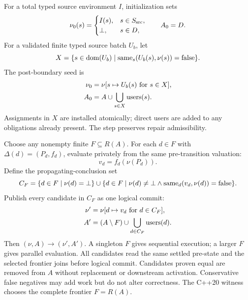 For a total typed source environment $I$, initialization sets
\begin{equation}
\nu_0(s)=\begin{cases}I(s),&s\in S_{\mathrm{src}},\\\bot,&s\in D,\end{cases}\qquad A_0=D.
\label{eq:init}
\end{equation}
For a validated finite typed source batch $U_b$, let
\begin{equation}
X=\{s\in\operatorname{dom}(U_b)\mid \operatorname{same}_s(U_b(s),\nu(s))=\mathrm{false}\}.
\label{eq:changed}
\end{equation}
The post-boundary seed is
\begin{align}
\nu_0&=\nu[s\mapsto U_b(s)\text{ for }s\in X],\label{eq:updateval}\\
A_0&=A\cup\bigcup_{s\in X}\operatorname{users}(s).\label{eq:updateactive}
\end{align}
Assignments in $X$ are installed atomically; direct users are added to any obligations already present. The step preserves repair admissibility.

Choose any nonempty finite $F\subseteq R(A)$. For each $d\in F$ with $\Delta(d)=(P_d,f_d)$, evaluate privately from the same pre-transition valuation:
\begin{equation}v_d=f_d(\nu(P_d)).\label{eq:candidate}\end{equation}
Define the propagating-conclusion set
\begin{equation}
C_F=\{d\in F\mid \nu(d)=\bot\}\cup\{d\in F\mid \nu(d)\neq\bot\land\operatorname{same}_d(v_d,\nu(d))=\mathrm{false}\}.
\label{eq:cf}
\end{equation}
Publish every candidate in $C_F$ as one logical commit:
\begin{align}
\nu'&=\nu[d\mapsto v_d\text{ for }d\in C_F],\label{eq:publish}\\
A'&=(A\setminus F)\cup\bigcup_{d\in C_F}\operatorname{users}(d).\label{eq:nextactive}
\end{align}
Then $(\nu,A)\to(\nu',A')$. A singleton $F$ gives sequential execution; a larger $F$ gives parallel evaluation. All candidates read the same settled pre-state and the selected frontier joins before logical commit. Candidates proven equal are removed from $A$ without replacement or downstream activation. Conservative false negatives may add work but do not alter correctness. The C++20 witness chooses the complete frontier $F=R(A)$.

